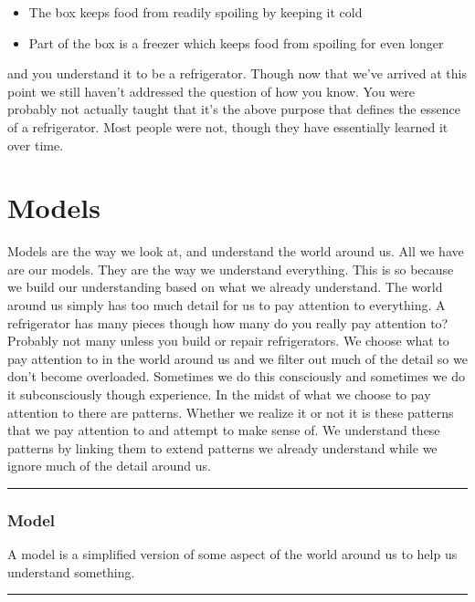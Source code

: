 \documentclass[]{memoir}
\begin{document}
\begin{itemize}
\itemsep1pt\parskip0pt
\item
  The box keeps food from readily spoiling by keeping it cold
\item
  Part of the box is a freezer which keeps food from spoiling for even
  longer
\end{itemize}

and you understand it to be a refrigerator. Though now that we've
arrived at this point we still haven't addressed the question of how you
know. You were probably not actually taught that it's the above purpose
that defines the essence of a refrigerator. Most people were not, though
they have essentially learned it over time.

\section{Models}

Models are the way we look at, and understand the world around us. All
we have are our models. They are the way we understand everything. This
is so because we build our understanding based on what we already
understand. The world around us simply has too much detail for us to pay
attention to everything. A refrigerator has many pieces though how many
do you really pay attention to? Probably not many unless you build or
repair refrigerators. We choose what to pay attention to in the world
around us and we filter out much of the detail so we don't become
overloaded. Sometimes we do this consciously and sometimes we do it
subconsciously though experience. In the midst of what we choose to pay
attention to there are patterns. Whether we realize it or not it is
these patterns that we pay attention to and attempt to make sense of. We
understand these patterns by linking them to extend patterns we already
understand while we ignore much of the detail around us.

\begin{center}\rule{3in}{0.4pt}\end{center}

\subsubsection{Model}

A model is a simplified version of some aspect of the world around us to
help us understand something.

\begin{center}\rule{3in}{0.4pt}\end{center}
\end{document}
